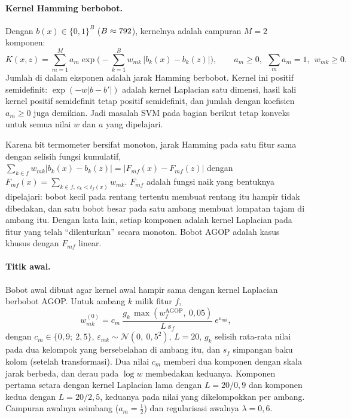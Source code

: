 \paragraph{Kernel Hamming berbobot.} Dengan $b(x) \in \{0,1\}^{B}$ ($B \approx 792{}$), kernelnya adalah campuran $M = 2$ komponen:
\begin{equation}
	K(x, z) = \sum_{m=1}^{M} a_m \exp\Big(-\sum_{k=1}^{B} w_{mk}\,\big|b_k(x) - b_k(z)\big|\Big), \qquad a_m \ge 0,\ \ \sum_m a_m = 1,\ \ w_{mk} \ge 0 .
	\label{eq:svm-kernel-termometer}
\end{equation}
Jumlah di dalam eksponen adalah jarak Hamming berbobot. Kernel ini positif semidefinit: $\exp(-w|b - b'|)$ adalah kernel Laplacian satu dimensi, hasil kali kernel positif semidefinit tetap positif semidefinit, dan jumlah dengan koefisien $a_m \ge 0$ juga demikian. Jadi masalah SVM pada bagian berikut tetap konveks untuk semua nilai $w$ dan $a$ yang dipelajari.

Karena bit termometer bersifat monoton, jarak Hamming pada satu fitur sama dengan selisih fungsi kumulatif, $\sum_{k \in f} w_{mk}|b_k(x) - b_k(z)| = |F_{mf}(x) - F_{mf}(z)|$ dengan $F_{mf}(x) = \sum_{k \in f,\ c_k < t_f(x)} w_{mk}$. $F_{mf}$ adalah fungsi naik yang bentuknya dipelajari: bobot kecil pada rentang tertentu membuat rentang itu hampir tidak dibedakan, dan satu bobot besar pada satu ambang membuat lompatan tajam di ambang itu. Dengan kata lain, setiap komponen adalah kernel Laplacian pada fitur yang telah ``dilenturkan'' secara monoton. Bobot AGOP adalah kasus khusus dengan $F_{mf}$ linear.

\paragraph{Titik awal.} Bobot awal dibuat agar kernel awal hampir sama dengan kernel Laplacian berbobot AGOP. Untuk ambang $k$ milik fitur $f$,
\begin{equation}
	w_{mk}^{(0)} = c_m\ \frac{g_k\,\max(w_f^{\text{AGOP}},\ 0{,}05)}{L\,s_f}\ e^{\varepsilon_{mk}},
\end{equation}
dengan $c_m \in \{0{,}9;\ 2{,}5\}$, $\varepsilon_{mk} \sim \mathcal{N}(0,\ 0{,}5^2)$, $L = 20$, $g_k$ selisih rata-rata nilai pada dua kelompok yang bersebelahan di ambang itu, dan $s_f$ simpangan baku kolom (setelah transformasi). Dua nilai $c_m$ memberi dua komponen dengan skala jarak berbeda, dan derau pada $\log w$ membedakan keduanya. Komponen pertama setara dengan kernel Laplacian lama dengan $L = 20/0{,}9$ dan komponen kedua dengan $L = 20/2{,}5$, keduanya pada nilai yang dikelompokkan per ambang. Campuran awalnya seimbang ($a_m = \tfrac12$) dan regularisasi awalnya $\lambda = 0{,}6$.

